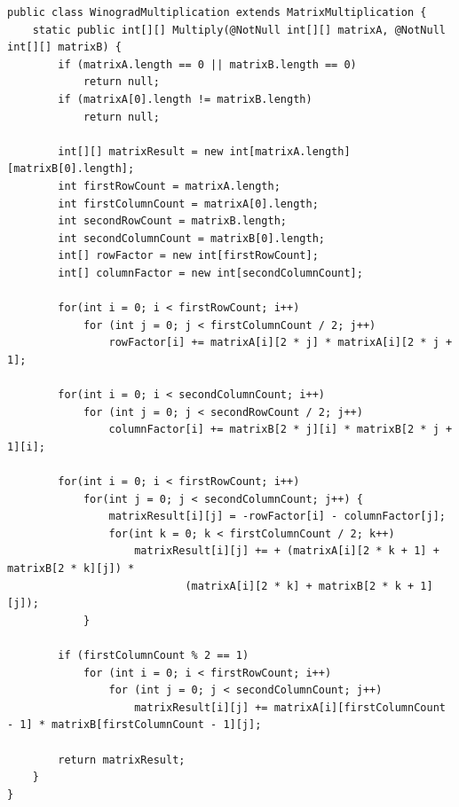 \documentclass[12pt]{report}
\begin{document}
\begin{lstlisting}[label=some-code,caption=Алгоритм Винограда]
public class WinogradMultiplication extends MatrixMultiplication {
    static public int[][] Multiply(@NotNull int[][] matrixA, @NotNull int[][] matrixB) {
        if (matrixA.length == 0 || matrixB.length == 0)
            return null;
        if (matrixA[0].length != matrixB.length)
            return null;

        int[][] matrixResult = new int[matrixA.length][matrixB[0].length];
        int firstRowCount = matrixA.length;
        int firstColumnCount = matrixA[0].length;
        int secondRowCount = matrixB.length;
        int secondColumnCount = matrixB[0].length;
        int[] rowFactor = new int[firstRowCount];
        int[] columnFactor = new int[secondColumnCount];

        for(int i = 0; i < firstRowCount; i++)
            for (int j = 0; j < firstColumnCount / 2; j++)
                rowFactor[i] += matrixA[i][2 * j] * matrixA[i][2 * j + 1];

        for(int i = 0; i < secondColumnCount; i++)
            for (int j = 0; j < secondRowCount / 2; j++)
                columnFactor[i] += matrixB[2 * j][i] * matrixB[2 * j + 1][i];

        for(int i = 0; i < firstRowCount; i++)
            for(int j = 0; j < secondColumnCount; j++) {
                matrixResult[i][j] = -rowFactor[i] - columnFactor[j];
                for(int k = 0; k < firstColumnCount / 2; k++)
                    matrixResult[i][j] += + (matrixA[i][2 * k + 1] + matrixB[2 * k][j]) *
                            (matrixA[i][2 * k] + matrixB[2 * k + 1][j]);
            }

        if (firstColumnCount % 2 == 1)
            for (int i = 0; i < firstRowCount; i++)
                for (int j = 0; j < secondColumnCount; j++)
                    matrixResult[i][j] += matrixA[i][firstColumnCount - 1] * matrixB[firstColumnCount - 1][j];

        return matrixResult;
    }
}
\end{lstlisting}
\end{document}
